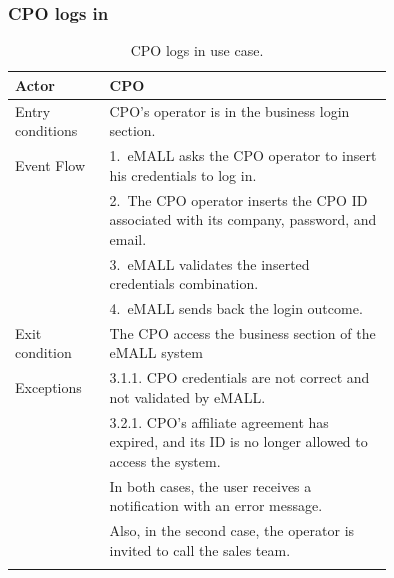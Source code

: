 \subsubsection*{CPO logs in}
\begin{center}
    \begin{longtable}{lp{0.75\linewidth}}
        \hline
        Actor            & CPO                                                                                                 \\
        \hline
        Entry conditions & CPO’s operator is in the business login section.                                                    \\
        \hline
        Event Flow       & 1.\ eMALL asks the CPO operator to insert his credentials to log in.                                \\
        & 2.\ The CPO operator inserts the CPO ID associated with its company, password, and email.           \\
        & 3.\ eMALL validates the inserted credentials combination.                                           \\
        & 4.\ eMALL sends back the login outcome.                                                             \\
        \hline
        Exit condition   & The CPO access the business section of the eMALL system                                             \\
        \hline
        Exceptions       & 3.1.1. CPO credentials are not correct and not validated by eMALL.                                  \\
        & 3.2.1. CPO’s affiliate agreement has expired, and its ID is no longer allowed to access the system. \\
        & In both cases, the user receives a notification with an error message.                              \\
        & Also, in the second case, the operator is invited to call the sales team.                           \\
        \hline
        \caption{CPO logs in use case.}
        \label{tab: CPO_logs_in_use_case}
    \end{longtable}
\end{center}

